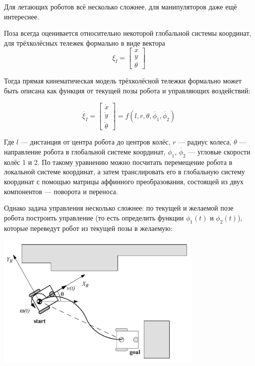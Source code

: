\documentclass{../../text-style}
\begin{document}
Для летающих роботов всё несколько сложнее, для манипуляторов даже ещё интереснее.

Поза всегда оценивается относительно некоторой глобальной системы координат, для трёхколёсных тележек формально в виде вектора
$$\xi_I = \begin{bmatrix} x \\ y \\ \theta \end{bmatrix}$$

Тогда прямая кинематическая модель трёхколёсной тележки формально может быть описана как функция от текущей позы робота и управляющих воздействий:

$$\dot{\xi_I} = \begin{bmatrix} \dot{x} \\ \dot{y} \\ \dot{\theta} \end{bmatrix} = f(l, r, \theta, \dot{\phi_1}, \dot{\phi_2})$$

Где $l$ --- дистанция от центра робота до центров колёс, $r$ --- радиус колеса, $\theta$ --- направление робота в глобальной системе координат, $\dot{\phi_1}$, $\dot{\phi_2}$ --- угловые скорости колёс 1 и 2. По такому уравнению можно посчитать перемещение робота в локальной системе координат, а затем транслировать его в глобальную систему координат с помощью матрицы аффинного преобразования, состоящей из двух компонентов --- поворота и переноса.

Однако задача управления несколько сложнее: по текущей и желаемой позе робота построить управление (то есть определить функции $\phi_1(t)$ и $\phi_2(t)$), которые переведут робот из текущей позы в желаемую:

\begin{center}
    \includegraphics[width=0.75\textwidth]{inverseKinematics.png}
\end{center}
\end{document}
